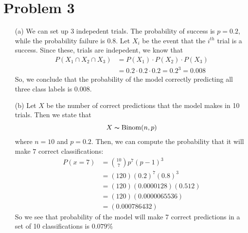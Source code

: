 \documentclass[12pt, letterpaper]{article}
\begin{document}
\section*{Problem 3}
\begin{enumerate}
    \item [(a)] We can set up 3 indepedent trials. The probability of success is $p=0.2$, while the probability
    failure is $0.8$. Let $X_i$ be the event that the $i^{th}$ trial is a 
    success. Since these, trials are indepedent, we know that 
    \begin{align*}
        P(X_1 \cap X_2 \cap X_3) &= P(X_1) \cdot P(X_2) \cdot P(X_3) \\
        &= 0.2 \cdot 0.2 \cdot 0.2 = 0.2 ^ 3 = 0.008
    \end{align*}
    So, we conclude that the probability of the model correctly predicting all three class labels is $0.008$.
    \item [(b)] Let $X$ be the number of correct predictions that the model makes in 10 trials. Then we state that 
    \[
        X \thicksim \text{Binom}(n, p)
    \]
    where $n=10$ and $p = 0.2$. Then, we can compute the probability that it will make $7$ correct 
    classifications:
    \begin{align*}
        P(x = 7) &= \binom{10}{7}p^7(p-1)^3 \\
        &= (120)(0.2)^7(0.8)^3 \\
        &= (120)(0.0000128)(0.512)\\
        &= (120)(0.0000065536)\\
        &= (0.000786432)
    \end{align*}
    So we see that probability of the model will make 7 correct predictions in a set of 10 classifications is 
    $0.079\%$
\end{enumerate}

\newpage
\noindent\makebox[\linewidth]{\rule{18cm}{0.4pt}}
\end{document}
